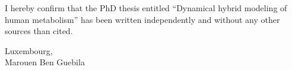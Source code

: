 I hereby confirm that the PhD thesis entitled ``Dynamical hybrid modeling of human metabolism'' has been written independently and without any other sources than cited.\\

\vspace{40pt}

Luxembourg, \underline{\hspace{3cm}} \hfill \underline{\hspace{6cm}}\\
\vspace{10pt}
\hfill Marouen Ben Guebila
